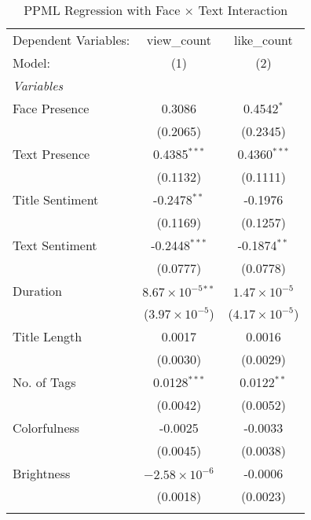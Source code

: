 \begin{table}[htbp]
   \caption{PPML Regression with Face × Text Interaction}
   \centering
   \begin{tabular}{lcc}
      \tabularnewline \midrule \midrule
      Dependent Variables: & view\_count                  & like\_count\\   
      Model:               & (1)                          & (2)\\  
      \midrule
      \emph{Variables}\\
      Face Presence        & 0.3086                       & 0.4542$^{*}$\\   
                           & (0.2065)                     & (0.2345)\\   
      Text Presence        & 0.4385$^{***}$               & 0.4360$^{***}$\\   
                           & (0.1132)                     & (0.1111)\\   
      Title Sentiment      & -0.2478$^{**}$               & -0.1976\\   
                           & (0.1169)                     & (0.1257)\\   
      Text Sentiment       & -0.2448$^{***}$              & -0.1874$^{**}$\\   
                           & (0.0777)                     & (0.0778)\\   
      Duration             & $8.67\times 10^{-5}$$^{**}$  & $1.47\times 10^{-5}$\\    
                           & ($3.97\times 10^{-5}$)       & ($4.17\times 10^{-5}$)\\    
      Title Length         & 0.0017                       & 0.0016\\   
                           & (0.0030)                     & (0.0029)\\   
      No. of Tags          & 0.0128$^{***}$               & 0.0122$^{**}$\\   
                           & (0.0042)                     & (0.0052)\\   
      Colorfulness         & -0.0025                      & -0.0033\\   
                           & (0.0045)                     & (0.0038)\\   
      Brightness           & $-2.58\times 10^{-6}$        & -0.0006\\   
                           & (0.0018)                     & (0.0023)\\   
$$
\end{tabular}
\end{table}
